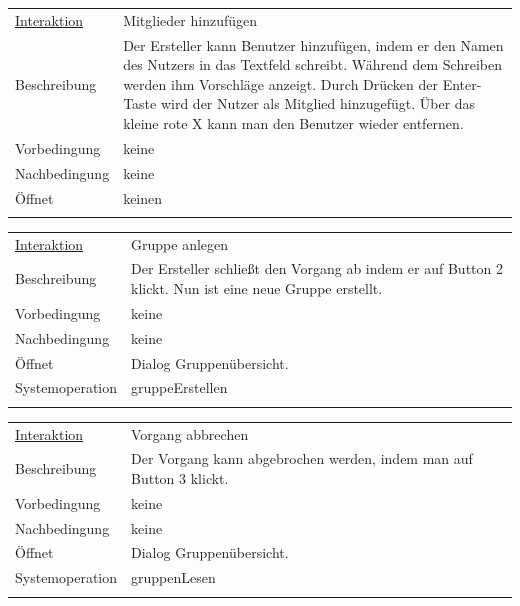 \documentclass[12pt,a4paper]{article}
\begin{document}
{\begin{tabular}{l p{12cm}}
	\underline{Interaktion} 	 & Mitglieder hinzufügen\\ 
	Beschreibung   	& Der Ersteller kann Benutzer hinzufügen, indem er den Namen des Nutzers in das Textfeld schreibt. Während dem Schreiben werden ihm Vorschläge anzeigt. Durch Drücken der Enter-Taste wird der Nutzer als Mitglied hinzugefügt. Über das kleine rote X kann man den Benutzer wieder entfernen.\\
	Vorbedingung	& keine \\
	Nachbedingung	& keine \\
	Öffnet			& keinen\\\\
\end{tabular}

\begin{tabular}{l p{12cm}}
	\underline{Interaktion} 	 & Gruppe anlegen\\ 
	Beschreibung   	& Der Ersteller schließt den Vorgang ab indem er auf Button 2 klickt. Nun ist eine neue Gruppe erstellt.\\
	Vorbedingung	& keine \\
	Nachbedingung	& keine \\
	Öffnet			& Dialog \glqq Gruppenübersicht\grqq.\\
	Systemoperation & gruppeErstellen\\\\
\end{tabular}

\begin{tabular}{l p{12cm}}
	\underline{Interaktion} 	 & Vorgang abbrechen\\ 
	Beschreibung   	& Der Vorgang kann abgebrochen werden, indem man auf Button 3 klickt.\\
	Vorbedingung	& keine \\
	Nachbedingung	& keine \\
	Öffnet			& Dialog \glqq Gruppenübersicht\grqq.\\
	Systemoperation & gruppenLesen\\\\
\end{tabular}

\begin{figure}[H]
	\centering

\end{figure}}
\end{document}
